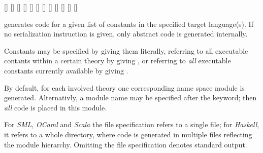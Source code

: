 \begin{isabellebody}
\begin{isamarkuptext}
\begin{railoutput}
[]
\rail@endplus
{}
[]
\rail@endplus
\rail@endbar
\rail@endbar
{}
\rail@bar
{}
[]
\rail@plus
{}[]
\rail@endplus
\rail@endbar
\rail@bar
{}
[]
[]
\rail@endbar
\rail@end
{}
\rail@bar
{}[]
\rail@bar
{}[]
[]
[]
\rail@endbar
{}[]
[]
\rail@endbar
\rail@end
\end{railoutput}


  \begin{description}

  \item \hyperlink{command.HOL.export-code}{\mbox{}} generates code for a given list
  of constants in the specified target language(s).  If no
  serialization instruction is given, only abstract code is generated
  internally.

  Constants may be specified by giving them literally, referring to
  all executable contants within a certain theory by giving , or referring to \emph{all} executable constants currently
  available by giving .

  By default, for each involved theory one corresponding name space
  module is generated.  Alternativly, a module name may be specified
  after the \hyperlink{keyword.module-name}{\mbox{}} keyword; then \emph{all} code is
  placed in this module.

  For \emph{SML}, \emph{OCaml} and \emph{Scala} the file specification
  refers to a single file; for \emph{Haskell}, it refers to a whole
  directory, where code is generated in multiple files reflecting the
  module hierarchy.  Omitting the file specification denotes standard
  output.


\end{description}
\end{isamarkuptext}
\end{isabellebody}
